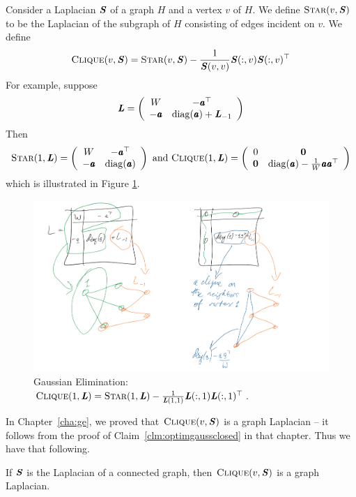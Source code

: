 Consider a Laplacian $\SS$ of a graph $H$ and a vertex $v$ of $H$.
We define $\vstar{v}{\SS}$ to be the Laplacian of the subgraph of $H$
consisting of edges incident on $v$.
We define
\[
\vcliq{v}{\SS} = \vstar{v}{\SS} - \frac{1}{\SS(v,v)} \SS(:,v)  \SS(:,v)^{\trp}
\]
For example, suppose
\[
  \LL =
\left(
\begin{array}{ccc}
W & -\aa^\trp \\
-\aa& \diag(\aa) + \LL_{-1}
\end{array} \right)
\]
Then
\[
\vstar{1}{\LL}
=
\left(
\begin{array}{ccc}
W & -\aa^\trp \\
-\aa& \diag(\aa)
\end{array} \right)
\text{ and }
\vcliq{1}{\LL}
=
\left(
\begin{array}{ccc}
0 &  \veczero \\
\veczero & \diag(\aa) - \frac{1}{W} \aa \aa^\trp
\end{array} \right)
\]
which is illustrated in Figure \ref{fig:schurclique}.
%
\begin{figure}[H]
  \centering
  \includegraphics[width=1
  \textwidth]{fig/lecture7_schur-clique.jpeg}
  \caption{Gaussian Elimination:
    $\vcliq{1}{\LL} = \vstar{1}{\LL} - \frac{1}{\LL(1,1)} \LL(:,1)
    \LL(:,1)^{\trp}$.}
      \label{fig:schurclique}
    \end{figure}
In Chapter~\ref{cha:ge}, we proved that $\vcliq{v}{\SS}$ is a graph Laplacian --
it follows from the proof of Claim~\ref{clm:optimgaussclosed} in that chapter.
Thus we have that following.
 \begin{claim}
\label{clm:optimgaussclosedagain}
If $\SS$ is the Laplacian of a connected graph, then
$\vcliq{v}{\SS}$ is a graph Laplacian.
\end{claim}

